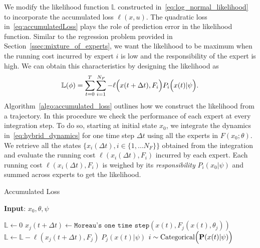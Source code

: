 \begin{enumerate}
    We modify the likelihood function $\mathbb{L}$ constructed
    in~\eqref{eq:log_normal_likelihood} to incorporate the accumulated loss
    $\ell(x, u)$.
    The quadratic loss in~\eqref{eq:accumulatedLoss} plays the role of prediction
    error in the likelihood function.
    Similar to the regression problem provided in
    Section~\ref{ssec:mixture_of_experts}, we want the likelihood to be maximum
    when the running cost incurred by expert $i$ is low and the responsibility
    of the expert is high.
    We can obtain this characteristics by designing the likelihood as
    \begin{align}
        \mathbb{L}(\phi) = \sum_{t=0}^{T} \sum_{i=1}^{N_F} - \ell \Bigl(x(t+\Delta t), F_i \Bigr) P_i\Bigl(x(t) | \psi \Bigr)  .
        \label{eq:accumulated_likelihood}
    \end{align}
    Algorithm~\ref{algo:accumulated_loss} outlines how we construct the
    likelihood from a trajectory.
    In this procedure we check the performance of each expert at every
    integration step.
    To do so, starting at initial state $x_0$, we integrate the dynamics
    in~\eqref{eq:hybrid_dynamics} for one time step $\Delta t$ using all the
    experts in $F(x_0;\theta)$.
    We retrieve all the states $\{ x_i(\Delta t) , i \in \{1, \dots N_F \}\}$
    obtained from the integration and evaluate the running cost $\ell(x_i(\Delta
    t), F_i)$ incurred by each expert.
    Each running cost $\ell(x_i(\Delta t), F_i)$ is weighed by its
    \textit{responsibility} $P_i(x_0 | \psi)$ and summed across experts to get
    the likelihood.
    \begin{algorithm}[tb]
        \caption{Accumulated Loss}
        \label{algo:accumulated_loss}
        \small
        \hspace*{\algorithmicindent} \textbf{Input}: $x_0, \theta, \psi$
        \begin{algorithmic}[1]
            \State $\mathbb{L} \leftarrow 0$
                    \State $x_j(t+\Delta t) \leftarrow \texttt{Moreau's one time step}(x(t), F_j(x(t), \theta_j))$
                    \State $\mathbb{L} \leftarrow \mathbb{L} - \ell(x_j(t+\Delta t), F_j) \; P_j(x(t) | \psi)$
                \EndFor
                \State $i \sim \text{Categorical}\Bigl(\mathbf{P}(x(t)| \psi)\Bigr)$ 

\end{algorithmic}
\end{algorithm}
\end{enumerate}
